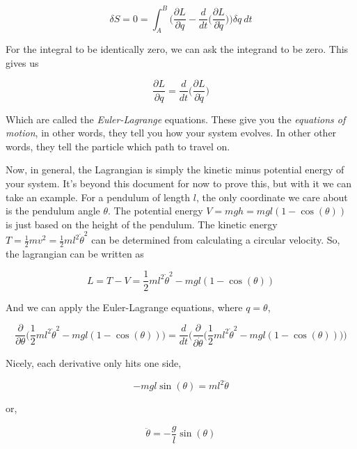 \documentclass{article}
\begin{document}
\begin{equation}
    \delta S = 0 = \int_A^B \biggl( \frac{\partial L}{\partial q} - \frac{d}{dt}\biggl(\frac{\partial L}{\partial \dot{q}}\biggr) \biggr) \delta q~dt
\end{equation}

For the integral to be identically zero, we can ask the integrand to be zero. This gives us

\begin{equation}
    \frac{\partial L}{\partial q} = \frac{d}{dt}\biggl(\frac{\partial L}{\partial \dot{q}}\biggr)
\end{equation}

Which are called the \textit{Euler-Lagrange} equations. These give you the \textit{equations of motion}, in other words, they tell you how your system evolves. In other other words, they tell the particle which path to travel on.

Now, in general, the Lagrangian is simply the kinetic minus potential energy of your system. It's beyond this document for now to prove this, but with it we can take an example. For a pendulum of length $l$, the only coordinate we care about is the pendulum angle $\theta$. The potential energy $V = mgh = mgl(1-\cos(\theta))$ is just based on the height of the pendulum. The kinetic energy $T = \frac{1}{2}mv^2 = \frac{1}{2}ml^2\dot{\theta}^2$ can be determined from calculating a circular velocity. So, the lagrangian can be written as

\begin{equation}
    L = T - V = \frac{1}{2}ml^2\dot{\theta}^2 - mgl(1-\cos(\theta))
\end{equation}

And we can apply the Euler-Lagrange equations, where $q = \theta$,

\begin{equation}
    \frac{\partial}{\partial \theta} \biggl( \frac{1}{2}ml^2\dot{\theta}^2 - mgl(1-\cos(\theta)) \biggr) = \frac{d}{dt}\biggl(\frac{\partial}{\partial \dot{\theta}} \biggl( \frac{1}{2}ml^2\dot{\theta}^2 - mgl(1-\cos(\theta)) \biggr) \biggr)
\end{equation}

Nicely, each derivative only hits one side,

\begin{equation}
    - mgl \sin(\theta) = ml^2\ddot{\theta}
\end{equation}

or,

\begin{equation}
    \ddot{\theta} = - \frac{g}{l}\sin(\theta)
\end{equation}
\end{document}
